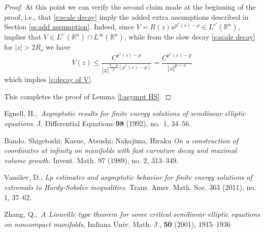 \documentclass[10pt]{amsart}
\begin{document}
\begin{proof}
 At this point  we can verify the second claim made at the beginning of the proof, i.e.,  that \eqref{e:scale decay} imply the added extra assumptions described in Section \ref{ss:add assumption}.  Indeed, since $V=R(z)u^{p^*(s)-p}\in L^{r'}(\mathbb{R}^n)$,  \cite[Theorem 2.4]{V11} implies that $V\in L^{r'}(\mathbb{R}^n)\cap L^\infty(\mathbb{R}^n)$, while from the slow decay \eqref{e:scale decay}   for $|z|>2R_o$ we have
\[
V(z)\leq \frac {C^{p^*(s)-p}}{|z|^{\frac {n-p}{p}(p^*(s)-p)}}=\frac {C^{p^*(s)-p}}{|z|^{p-s}}
\]
which implies \eqref{e:decay of V}.

This completes the proof of Lemma \ref{l:asympt HS}.
\end{proof}






\begin{thebibliography}{}
Egnell, H.,\  \emph{Asymptotic results for finite energy solutions
of semilinear elliptic equations}.  J. Differential Equations  {\bf
98} (1992),  no.~1, 34--56.

 Bando, Shigetoshi; Kasue, Atsushi; Nakajima, Hiraku
\emph{On a construction of coordinates at infinity on manifolds with fast curvature decay and maximal volume growth.} Invent. Math. 97 (1989), no. 2, 313--349.

 Vassilev, D., \emph{ Lp estimates and asymptotic behavior for finite energy solutions of extremals to Hardy-Sobolev inequalities.} Trans. Amer. Math. Soc. 363 (2011), no. 1, 37--62.

Zhang, Q.,\  \emph{A Liouville type theorem for some critical
semilinear elliptic equations on noncompact manifolds}, Indiana
Univ. Math. J., {\bf 50} (2001), 1915--1936
\end{thebibliography}
\end{document}
